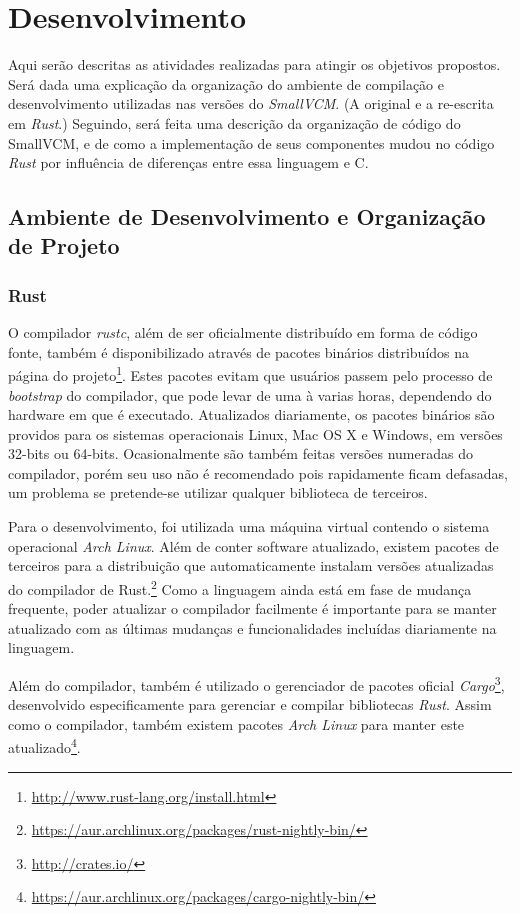\documentclass[tg]{mdtufsm}
\def\Cpp{{C\nolinebreak[4]\raisebox{.20ex}{\small\bf++}}}
\begin{document}
\chapter{Desenvolvimento}

Aqui serão descritas as atividades realizadas para atingir os objetivos propostos. Será dada uma explicação da organização do ambiente de compilação e desenvolvimento utilizadas nas versões do \emph{SmallVCM}. (A original e a re-escrita em \emph{Rust}.) Seguindo, será feita uma descrição da organização de código do SmallVCM, e de como a implementação de seus componentes mudou no código \emph{Rust} por influência de diferenças entre essa linguagem e \Cpp.

\section{Ambiente de Desenvolvimento e Organização de Projeto}

\subsection{Rust}

O compilador \emph{rustc}, além de ser oficialmente distribuído em forma de código fonte, também é disponibilizado através de pacotes binários distribuídos na página do projeto\footnote{\url{http://www.rust-lang.org/install.html}}. Estes pacotes evitam que usuários passem pelo processo de \emph{bootstrap} do compilador, que pode levar de uma à varias horas, dependendo do hardware em que é executado. Atualizados diariamente, os pacotes binários são providos para os sistemas operacionais Linux, Mac OS X e Windows, em versões 32-bits ou 64-bits. Ocasionalmente são também feitas versões numeradas do compilador, porém seu uso não é recomendado pois rapidamente ficam defasadas, um problema se pretende-se utilizar qualquer biblioteca de terceiros.

Para o desenvolvimento, foi utilizada uma máquina virtual contendo o sistema operacional \emph{Arch Linux}. Além de conter software atualizado, existem pacotes de terceiros para a distribuição que automaticamente instalam versões atualizadas do compilador de Rust.\footnote{\url{https://aur.archlinux.org/packages/rust-nightly-bin/}} Como a linguagem ainda está em fase de mudança frequente, poder atualizar o compilador facilmente é importante para se manter atualizado com as últimas mudanças e funcionalidades incluídas diariamente na linguagem.

Além do compilador, também é utilizado o gerenciador de pacotes oficial \emph{Cargo}\footnote{\url{http://crates.io/}}, desenvolvido especificamente para gerenciar e compilar bibliotecas \emph{Rust}. Assim como o compilador, também existem pacotes \emph{Arch Linux} para manter este atualizado\footnote{\url{https://aur.archlinux.org/packages/cargo-nightly-bin/}}.
\end{document}
